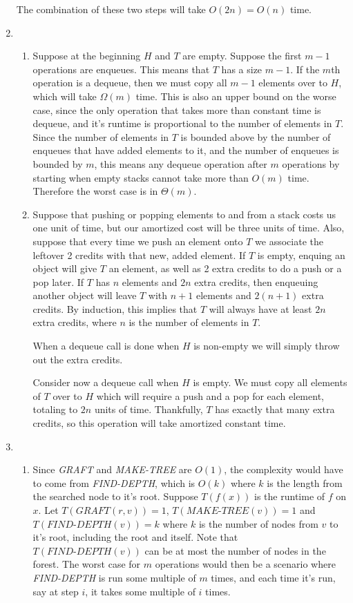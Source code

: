 \documentclass[letterpaper,10pt]{article}
\begin{document}
\begin{enumerate}
  The combination of these two steps will take $O(2n) = O(n)$ time.

  \clearpage
  \item

  \begin{enumerate}
    \item Suppose at the beginning $H$ and $T$ are empty. Suppose the first $m-1$ operations are enqueues. This means that $T$ has a size $m-1$. If the $m$th operation is a dequeue, then we must copy all $m-1$ elements over to $H$, which will take $\Omega(m)$ time. This is also an upper bound on the worse case, since the only operation that takes more than constant time is dequeue, and it's runtime is proportional to the number of elements in $T$. Since the number of elements in $T$ is bounded above by the number of enqueues that have added elements to it, and the number of enqueues is bounded by $m$, this means any dequeue operation after $m$ operations by starting when empty stacks cannot take more than $O(m)$ time. Therefore the worst case is in $\Theta(m)$.
    \item Suppose that pushing or popping elements to and from a stack costs us one unit of time, but our amortized cost will be three units of time. Also, suppose that every time we push an element onto $T$ we associate the leftover 2 credits with that new, added element. If $T$ is empty, enquing an object will give $T$ an element, as well as 2 extra credits to do a push or a pop later. If $T$ has $n$ elements and $2n$ extra credits, then enqueuing another object will leave $T$ with $n+1$ elements and $2(n+1)$ extra credits. By induction, this implies that $T$ will always have at least $2n$ extra credits, where $n$ is the number of elements in $T$.
    
    When a dequeue call is done when $H$ is non-empty we will simply throw out the extra credits.
    
    Consider now a dequeue call when $H$ is empty. We must copy all elements of $T$ over to $H$ which will require a push and a pop for each element, totaling to $2n$ units of time. Thankfully, $T$ has exactly that many extra credits, so this operation will take amortized constant time. 
  \end{enumerate}

  \clearpage
  \item

  \begin{enumerate}
    \item Since \textit{GRAFT} and \textit{MAKE-TREE} are $O(1)$, the complexity would have to come from \textit{FIND-DEPTH}, which is $O(k)$ where $k$ is the length from the searched node to it's root. Suppose $T(f(x))$ is the runtime of $f$ on $x$. Let $T(\textit{GRAFT}(r, v)) = 1$, $T(\textit{MAKE-TREE}(v)) = 1$ and $T(\textit{FIND-DEPTH}(v)) = k$ where $k$ is the number of nodes from $v$ to it's root, including the root and itself. Note that $T(\textit{FIND-DEPTH}(v))$ can be at most the number of nodes in the forest. The worst case for $m$ operations would then be a scenario where \textit{FIND-DEPTH} is run some multiple of $m$ times, and each time it's run, say at step $i$, it takes some multiple of $i$ times. 


\end{enumerate}
\end{enumerate}
\end{document}

